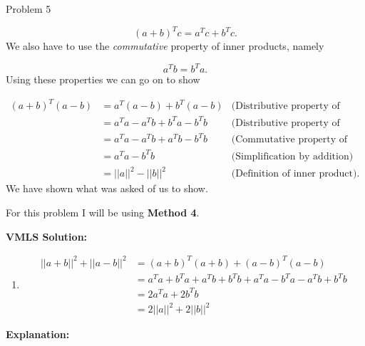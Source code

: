 \begin{problem}{Problem 5}
\begin{Highlight}
        \setcounter{equation}{0}
        \begin{equation}
            (a + b)^{T}c = a^{T}c + b^{T}c.
        \end{equation}
        We also have to use the \textit{commutative} property of inner products, namely

        \begin{equation}
            a^{T}b = b^{T}a.
        \end{equation}
        Using these properties we can go on to show

        \begin{align}
            (a+b)^{T}(a-b) & = a^{T}(a-b) + b^{T}(a-b) & \text{(Distributive property of inner products)} \\
            & = a^{T}a - a^{T}b + b^{T}a - b^{T}b & \text{(Distributive property of inner products)} \\
            & = a^{T}a - a^{T}b + a^{T}b - b^{T}b & \text{(Commutative property of inner products)} \\
            & = a^{T}a - b^{T}b & \text{(Simplification by addition)} \\
            & = ||a||^{2} - ||b||^{2} & \text{(Definition of inner product)}.
        \end{align}
        We have shown what was asked of us to show.
    \end{Highlight}

    \begin{Highlight}
        For this problem I will be using \textbf{Method 4}. \vspace*{1em}

        \textbf{VMLS Solution:}

        \begin{enumerate}[label=(\alph*), start=2]
            \item 
            \begin{align*}
                ||a + b||^{2} + ||a - b||^{2} & = (a + b)^{T}(a + b) + (a - b)^{T}(a - b) \\
                & = a^{T}a + b^{T}a + a^{T}b + b^{T}b + a^{T}a - b^{T}a - a^{T}b + b^{T}b \\
                & = 2a^{T}a + 2b^{T}b \\
                & = 2||a||^{2} + 2||b||^{2}
            \end{align*}
        \end{enumerate}

        \textbf{Explanation:} \vspace*{1em}


\end{Highlight}
\end{problem}
